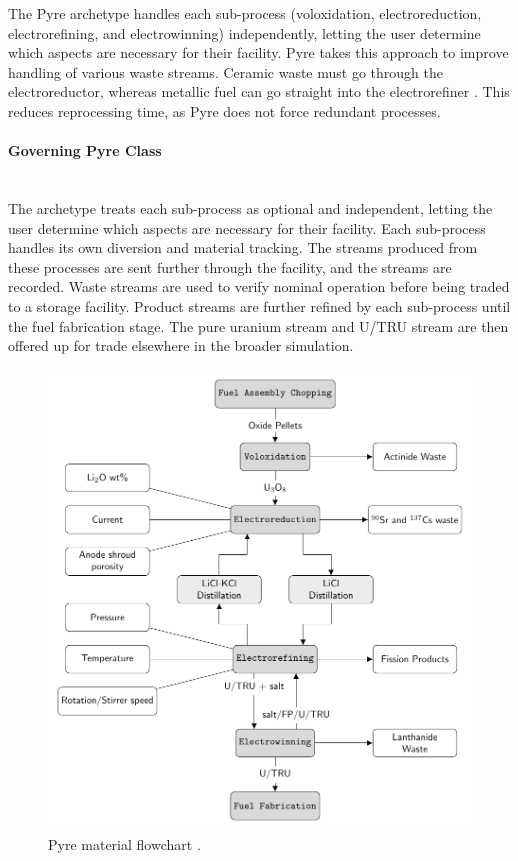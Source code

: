The Pyre archetype handles each sub-process (voloxidation, electroreduction, electrorefining, and electrowinning) independently, letting the user determine which aspects are necessary for their facility. Pyre takes this approach to improve handling of various waste streams. Ceramic waste must go through the electroreductor, whereas metallic fuel can go straight into the electrorefiner \cite{michael_f._simpson_developments_2012}. This reduces reprocessing time, as Pyre does not force redundant processes.

\paragraph{Governing Pyre Class} \mbox{}\\
The archetype treats each sub-process as optional and independent, letting the user determine which aspects are necessary for their facility. Each sub-process handles its own diversion and material tracking. The streams produced from these processes are sent further through the facility, and the streams are recorded. Waste streams are
used to verify nominal operation before being traded to a storage facility. Product streams are further refined by each sub-process until the fuel fabrication stage.
The pure uranium stream and U/TRU stream are then offered up for trade elsewhere in the broader \Cyclus simulation.

\FloatBarrier

\begin{figure}[h]
	\centering
	\includegraphics[width=0.9\linewidth]{images/flowchart}
	\caption{Pyre material flowchart \cite{borrelli_approaches_2017}.}
	\label{fig:flowchart}
\end{figure}

